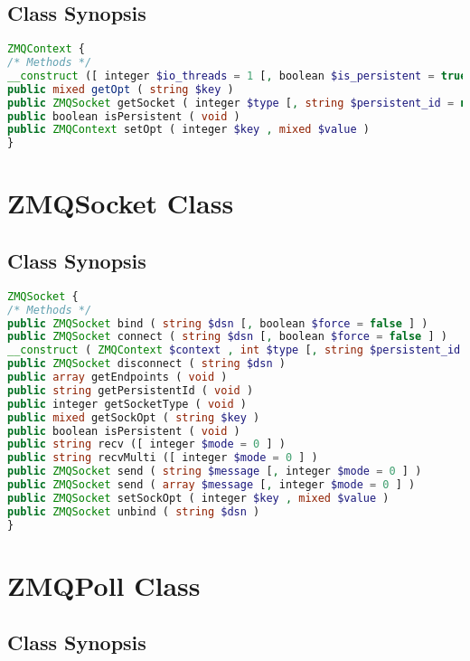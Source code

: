 \section{Class Synopsis}



\begin{lstlisting}[language=PHP]
ZMQContext {
/* Methods */
__construct ([ integer $io_threads = 1 [, boolean $is_persistent = true ]] )
public mixed getOpt ( string $key )
public ZMQSocket getSocket ( integer $type [, string $persistent_id = null [, callback $on_new_socket = null ]] )
public boolean isPersistent ( void )
public ZMQContext setOpt ( integer $key , mixed $value )
}
\end{lstlisting}



\chapter{ZMQSocket Class}


\section{Class Synopsis}


\begin{lstlisting}[language=PHP]
ZMQSocket {
/* Methods */
public ZMQSocket bind ( string $dsn [, boolean $force = false ] )
public ZMQSocket connect ( string $dsn [, boolean $force = false ] )
__construct ( ZMQContext $context , int $type [, string $persistent_id = null [, callback $on_new_socket = null ]] )
public ZMQSocket disconnect ( string $dsn )
public array getEndpoints ( void )
public string getPersistentId ( void )
public integer getSocketType ( void )
public mixed getSockOpt ( string $key )
public boolean isPersistent ( void )
public string recv ([ integer $mode = 0 ] )
public string recvMulti ([ integer $mode = 0 ] )
public ZMQSocket send ( string $message [, integer $mode = 0 ] )
public ZMQSocket send ( array $message [, integer $mode = 0 ] )
public ZMQSocket setSockOpt ( integer $key , mixed $value )
public ZMQSocket unbind ( string $dsn )
}
\end{lstlisting}


\chapter{ZMQPoll Class}

\section{Class Synopsis}


